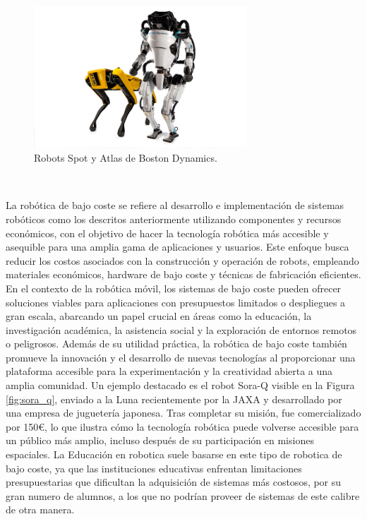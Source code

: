 \begin{figure} [h!]
  \begin{center}
    \includegraphics[width=8cm]{figs/atlas_spot_boston_dynamics}
  \end{center}
  \caption{Robots Spot y Atlas de Boston Dynamics.}
  \label{fig:atlas}
\end{figure}\

La robótica de bajo coste se refiere al desarrollo e implementación de sistemas
robóticos como los descritos anteriormente utilizando componentes y recursos
económicos, con el objetivo de hacer la tecnología robótica más accesible y
asequible para una amplia gama de aplicaciones y usuarios.
Este enfoque busca reducir los costos asociados con la construcción y operación
de robots, empleando materiales económicos, hardware de bajo coste y técnicas
de fabricación eficientes.
En el contexto de la robótica móvil, los sistemas de bajo coste pueden ofrecer
soluciones viables para aplicaciones con presupuestos limitados o despliegues a
gran escala, abarcando un papel crucial en áreas como la educación, la
investigación académica, la asistencia social y la exploración de entornos
remotos o peligrosos.
Además de su utilidad práctica, la robótica de bajo coste también promueve la
innovación y el desarrollo de nuevas tecnologías al proporcionar una plataforma
accesible para la experimentación y la creatividad abierta a una amplia
comunidad.
Un ejemplo destacado es el robot Sora-Q visible en la Figura \ref{fig:sora_q},
enviado a la Luna recientemente por la JAXA y desarrollado por una empresa de
juguetería japonesa.
Tras completar su misión, fue comercializado por 150€, lo que ilustra cómo la
tecnología robótica puede volverse accesible para un público más amplio, incluso
después de su participación en misiones espaciales.
La Educación en robotica suele basarse en este tipo de robotica de bajo coste,
ya que las instituciones educativas enfrentan limitaciones presupuestarias que
dificultan la adquisición de sistemas más costosos, por su gran numero de
alumnos, a los que no podrían proveer de sistemas de este calibre de otra
manera.

